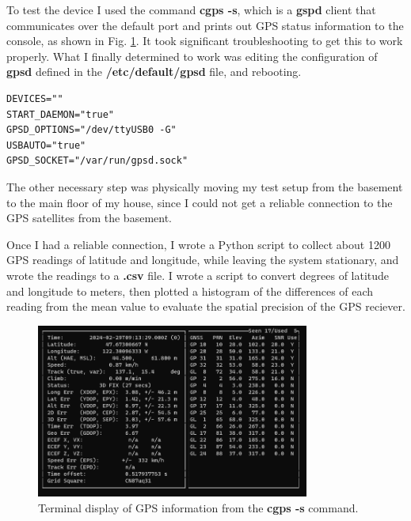 \documentclass[12pt]{article}
\begin{document}
To test the device I used the command \textbf{cgps -s}, which is a \textbf{gspd} client that communicates over the default port and prints out GPS status information to the console, as shown in Fig. \ref{fig:cgps}. It took significant troubleshooting to get this to work properly. What I finally determined to work was editing the configuration of \textbf{gpsd} defined in the \textbf{/etc/default/gpsd} file, and rebooting. 

\begin{lstlisting}
DEVICES=""
START_DAEMON="true"
GPSD_OPTIONS="/dev/ttyUSB0 -G"
USBAUTO="true"
GPSD_SOCKET="/var/run/gpsd.sock"
\end{lstlisting}

The other necessary step was physically moving my test setup from the basement to the main floor of my house, since I could not get a reliable connection to the GPS satellites from the basement.

Once I had a reliable connection, I wrote a Python script to collect about 1200 GPS readings of latitude and longitude, while leaving the system stationary, and wrote the readings to a \textbf{.csv} file. I wrote a script to convert degrees of latitude and longitude to meters, then plotted a histogram of the differences of each reading from the mean value to evaluate the spatial precision of the GPS reciever.

\begin{figure}[h]
\centering
\includegraphics[width=0.8\textwidth]{cgps.png} %
\caption{Terminal display of GPS information from the \textbf{cgps -s} command.}
\label{fig:cgps}
\end{figure}
\end{document}
